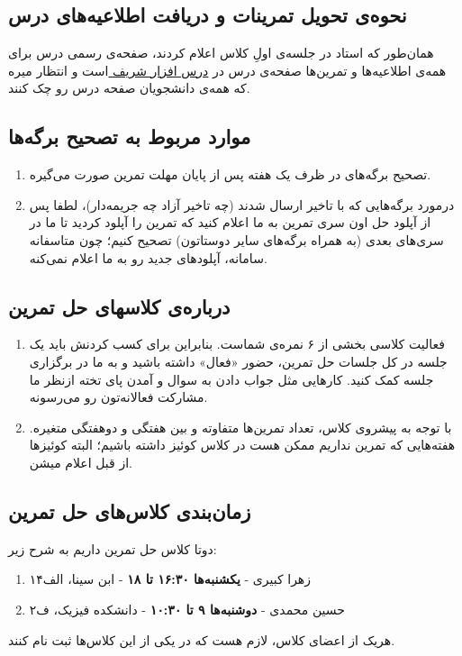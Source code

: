 \documentclass[a4paper, 12pt]{article}
\begin{document}
\subsection*{نحوه‌ی تحویل تمرینات و دریافت اطلاعیه‌های درس}
همان‌طور که استاد در جلسه‌ی اولِ کلاس اعلام کردند، صفحه‌ی رسمی درس برای همه‌ی اطلاعیه‌ها و تمرین‌ها صفحه‌ی درس در
\href{https://cw.sharif.edu/}{ درس افزار شریف }
است و انتظار میره که همه‌ی دانشجویان صفحه درس رو چک کنند. 
\subsection*{موارد مربوط به تصحیح برگه‌ها}
\begin{enumerate}
	\item 
	تصحیح برگه‌های در ظرف یک هفته پس از پایان مهلت تمرین صورت می‌گیره.
	\item 
	درمورد برگه‌هایی که با تاخیر ارسال شدند (چه تاخیر آزاد چه جریمه‌دار)، لطفا پس از آپلود حل اون سری تمرین به ما اعلام کنید که تمرین را آپلود کردید تا ما در سری‌های بعدی (به همراه برگه‌های سایر دوستاتون) تصحیح ‌کنیم؛ چون متاسفانه سامانه، آپلودهای جدید رو به ما اعلام نمی‌کنه.
\end{enumerate}



\subsection*{درباره‌ی کلاسهای حل تمرین}
\begin{enumerate}
	\item
فعالیت کلاسی بخشی از ۶ نمره‌ی شماست. بنابراین برای کسب کردنش باید یک جلسه در کل جلسات حل تمرین، حضور «فعال» داشته باشید و به ما در برگزاری جلسه کمک کنید. کارهایی مثل جواب دادن به سوال و آمدن پای تخته ازنظر ما مشارکت فعالانه‌تون رو می‌رسونه.

\item
با توجه به پیشروی کلاس، تعداد تمرین‌ها متفاوته و بین هفتگی و دوهفتگی متغیره. هفته‌هایی که تمرین نداریم ممکن هست در کلاس کوئیز داشته باشیم؛ البته کوئیزها از قبل اعلام میشن.
\end{enumerate}
\subsection*{زمان‌بندی کلاس‌های حل تمرین}
دوتا کلاس حل تمرین داریم به شرح زیر:

\begin{enumerate}
\item
زهرا کبیری - 
\textbf{یکشنبه‌ها ۱۶:۳۰ تا ۱۸ }
-
         ابن سینا، الف۱۴
\vspace{-0.5em}
\item
حسین محمدی -
\textbf{دوشنبه‌ها ۹ تا ۱۰:۳۰ }
  - دانشکده فیزیک، ف۲
\end{enumerate}
\noindent
هریک از اعضای کلاس، لازم هست که در یکی از این کلاس‌ها ثبت نام کنند.
\end{document}
